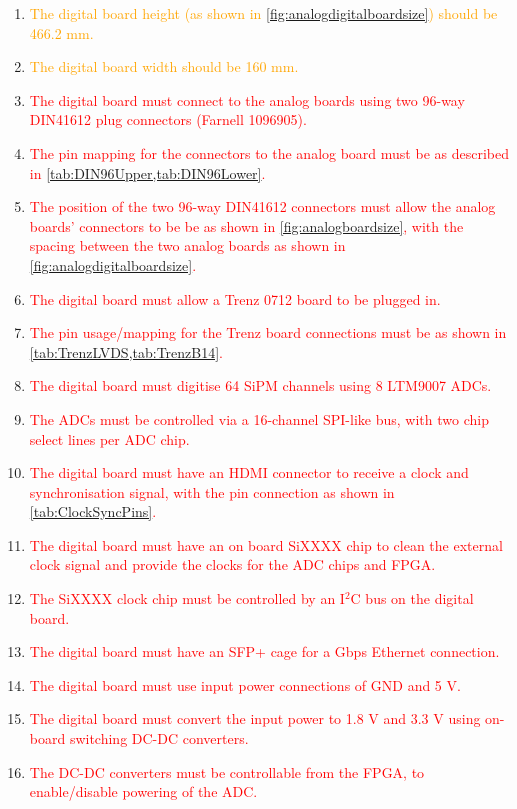 \documentclass[a4paper]{article}
\newcommand{\must}[1]{\textcolor{red}{#1}}
\newcommand{\should}[1]{\textcolor{orange}{#1}}
\def\I2C{I$^2$C}
\begin{document}
\begin{enumerate}
    \item \should{The digital board height (as shown in \cref{fig:analogdigitalboardsize}) should be 466.2 mm.}
    \item \should{The digital board width should be 160 mm.}
    \item \must{The digital board must connect to the analog boards using two 96-way DIN41612 plug connectors (Farnell 1096905).}
    \item \must{The pin mapping for the connectors to the analog board must be as described in \cref{tab:DIN96Upper,tab:DIN96Lower}.}
    \item \must{The position of the two 96-way DIN41612 connectors must allow the analog boards' connectors to be be as shown in \cref{fig:analogboardsize}, with the spacing between the two analog boards as shown in \cref{fig:analogdigitalboardsize}.}
    \item \must{The digital board must allow a Trenz 0712 board to be plugged in.}
    \item \must{The pin usage/mapping for the Trenz board connections must be as shown in \cref{tab:TrenzLVDS,tab:TrenzB14}.}
    \item \must{The digital board must digitise 64 SiPM channels using 8 LTM9007 ADCs.}
    \item \must{The ADCs must be controlled via a 16-channel SPI-like bus, with two chip select lines per ADC chip.}
    \item \must{The digital board must have an HDMI connector to receive a clock and synchronisation signal, with the pin connection as shown in \cref{tab:ClockSyncPins}.}
    \item \must{The digital board must have an on board SiXXXX chip to clean the external clock signal and provide the clocks for the ADC chips and FPGA.}
    \item \must{The SiXXXX clock chip must be controlled by an \I2C bus on the digital board.}
    \item \must{The digital board must have an SFP+ cage for a Gbps Ethernet connection.}
    \item \must{The digital board must use input power connections of GND and 5 V.}
    \item \must{The digital board must convert the input power to 1.8 V and 3.3 V using on-board switching DC-DC converters.}
    \item \must{The DC-DC converters must be controllable from the FPGA, to enable/disable powering of the ADC.}

\end{enumerate}
\end{document}
